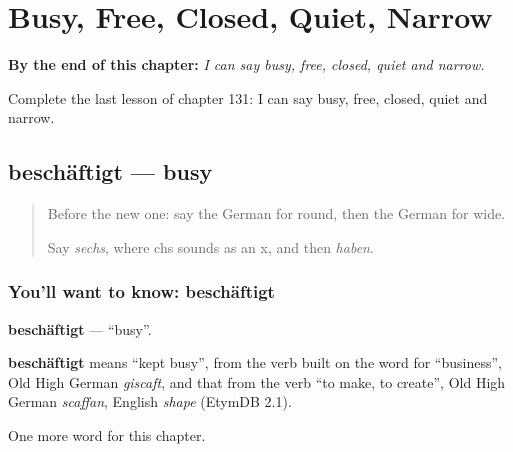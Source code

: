
\chapter{Busy, Free, Closed, Quiet, Narrow}
\label{ch:ge-busy-free-closed-quiet-narrow}

\begin{chapteropening}
\textbf{By the end of this chapter:} \emph{I can say busy, free, closed, quiet and narrow.}

Complete the last lesson of chapter 131: I can say busy, free, closed, quiet and narrow.
\end{chapteropening}

\section[beschäftigt]{beschäftigt — busy}

\label{lesson:GE-C131-beschaeftigt}



\begin{quote}
Before the new one: say the German for round, then the German for wide.

Say \emph{sechs}, where chs sounds as an x, and then \emph{haben}.
\end{quote}

\subsection*{You'll want to know: beschäftigt}
\textbf{beschäftigt} — \textquotedblleft{}busy\textquotedblright{}.

\begin{cousinweb}
\textbf{beschäftigt} means \textquotedblleft{}kept busy\textquotedblright{}, from the verb built on the word for \textquotedblleft{}business\textquotedblright{}, Old High German \emph{giscaft}, and that from the verb \textquotedblleft{}to make, to create\textquotedblright{}, Old High German \emph{scaffan}, English \emph{shape} (EtymDB 2.1).
\end{cousinweb}

\begin{grammarlens}[title={What you've built}]
One more word for this chapter.
\end{grammarlens}

